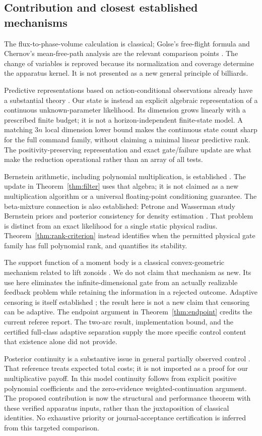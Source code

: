 \subsection{Contribution and closest established mechanisms}
The flux-to-phase-volume calculation is classical; Golse's free-flight
formula and Chernov's mean-free-path analysis are the relevant comparison
points \cite{Golse,Chernov}. The change of variables is reproved because its
normalization and coverage determine the apparatus kernel. It is not
presented as a new general principle of billiards.

Predictive representations based on action-conditional observations already
have a substantial theory \cite{LittmanSutton}. Our state is instead an
explicit algebraic representation of a continuous unknown-parameter
likelihood. Its dimension grows linearly with a prescribed finite budget;
it is not a horizon-independent finite-state model. A matching $3n$ local
dimension lower bound makes the continuous state count sharp for the
full command family, without claiming a minimal linear predictive rank.
The positivity-preserving representation and exact gate/failure update are
what make the reduction operational rather than an array of all tests.

Bernstein arithmetic, including polynomial multiplication, is established
\cite{FaroukiRajan}. The update in Theorem~\ref{thm:filter} uses that algebra;
it is not claimed as a new multiplication algorithm or a universal
floating-point conditioning guarantee. The beta-mixture connection is also
established: Petrone and Wasserman study Bernstein priors and posterior
consistency for density estimation \cite{PetroneWasserman}. That problem is
distinct from an exact likelihood for a single static physical radius.
Theorem~\ref{thm:rank-criterion} instead identifies when the permitted
physical gate family has full polynomial rank, and quantifies its stability.

The support function of a moment body is a classical convex-geometric
mechanism related to lift zonoids \cite{KulikTymoshkevych}. We do not claim
that mechanism as new. Its use here eliminates the infinite-dimensional
gate from an actually realizable feedback problem while retaining the
information in a rejected outcome. Adaptive censoring is itself established
\cite{RenEtAl}; the result here is not a new claim that censoring can be
adaptive. The endpoint argument in Theorem~\ref{thm:endpoint} credits the
current referee report. The two-arc result, implementation bound, and the
certified full-class adaptive separation supply the more specific control
content that existence alone did not provide.

Posterior continuity is a substantive issue in general partially observed
control \cite{FeinbergEtAl}. That reference treats expected total costs; it
is not imported as a proof for our multiplicative payoff. In this model
continuity follows from explicit positive polynomial coefficients and the
zero-evidence weighted-continuation argument. The proposed contribution is
now the structural and performance theorem with these verified apparatus
inputs, rather than the juxtaposition of classical identities. No exhaustive
priority or journal-acceptance certification is inferred from this targeted
comparison.

